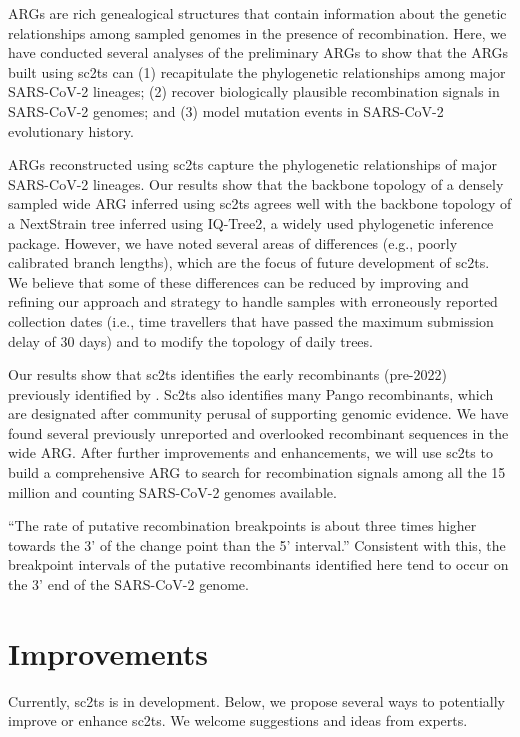 \documentclass{article}
\begin{document}
ARGs are rich genealogical structures that contain information about the
genetic relationships among sampled genomes in the presence of recombination.
Here, we have conducted several analyses of the preliminary ARGs to show that
the ARGs built using sc2ts can (1) recapitulate the phylogenetic relationships
among major SARS-CoV-2 lineages; (2) recover biologically plausible
recombination signals in SARS-CoV-2 genomes; and (3) model mutation events in
SARS-CoV-2 evolutionary history.

ARGs reconstructed using sc2ts capture the phylogenetic relationships of major
SARS-CoV-2 lineages. Our results show that the backbone topology of a densely
sampled wide ARG inferred using sc2ts agrees well with the backbone topology of
a NextStrain tree inferred using IQ-Tree2, a widely used phylogenetic inference
package. However, we have noted several areas of differences (e.g., poorly
calibrated branch lengths), which are the focus of future development of sc2ts.
We believe that some of these differences can be reduced by improving and
refining our approach and strategy to handle samples with erroneously reported
collection dates (i.e., time travellers that have passed the maximum submission
delay of 30 days) and to modify the topology of daily trees.

Our results show that sc2ts identifies the early recombinants (pre-2022)
previously identified by \cite{Jackson2021-ik}. Sc2ts also identifies many
Pango recombinants, which are designated after community perusal of supporting
genomic evidence. We have found several previously unreported and overlooked
recombinant sequences in the wide ARG. After further improvements and
enhancements, we will use sc2ts to build a comprehensive ARG to search for
recombination signals among all the 15 million and counting SARS-CoV-2 genomes
available.

``The rate of putative recombination breakpoints is about three times higher towards the 3' of the change point than the 5' interval.'' Consistent with this, the breakpoint intervals of the putative recombinants identified here tend to occur on the 3’ end of the SARS-CoV-2 genome.

\section{Improvements}
Currently, sc2ts is in development. Below, we propose several ways to potentially improve or enhance sc2ts. We welcome suggestions and ideas from experts.
\end{document}
